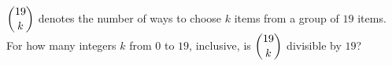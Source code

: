 $\dbinom{19}{k}$ denotes the number of ways to choose $k$ items from a group of $19$ items. For how many integers $k$ from $0$ to $19$, inclusive, is $\dbinom{19}k$ divisible by $19$?

